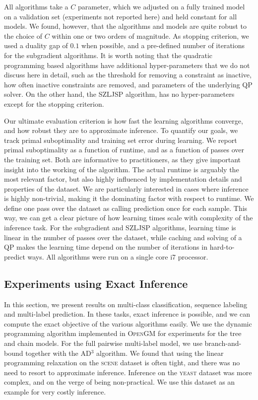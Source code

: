 All algorithms take a $C$ parameter, which we adjusted on a fully trained model
on a validation set (experiments not reported here) and held constant for all
models.  We found, however, that the algorithms and models are quite robust to
the choice of $C$ within one or two orders of magnitude.
As stopping criterion, we used a duality gap of $0.1$ when possible, and a
pre-defined number of iterations for the subgradient algorithms. It is worth
noting that the quadratic programming based algorithms have additional
hyper-parameters that we do not discuss here in detail, such as the threshold
for removing a constraint as inactive, how often inactive constraints are
removed, and parameters of the underlying QP solver. On the other hand, the
SZLJSP algorithm, has no hyper-parameters except for the stopping criterion.

Our ultimate evaluation criterion is how fast the learning algorithms converge,
and how robust they are to approximate inference.  To quantify our goals, we
track primal suboptimality and training set error during learning.
We report primal suboptimality as a function of runtime, and as a function of passes
over the training set.  Both are informative to practitioners, as they give
important insight into the working of the algorithm.  The actual runtime is
arguably the most relevant factor, but also highly influenced by
implementation details and properties of the dataset. We are particularly
interested in cases where inference is highly non-trivial, making it the
dominating factor with respect to runtime.
We define one pass over the dataset as calling prediction once for each sample.
This way, we can get a clear picture of how learning times scale with complexity of the
inference task. For the subgradient and SZLJSP algorithms, learning time is linear
in the number of passes over the dataset, while caching and solving of a QP makes
the learning time depend on the number of iterations in hard-to-predict ways.
All algorithms were run on a single core i7 processor.

\subsection{Experiments using Exact Inference}
In this section, we present results on multi-class classification, sequence
labeling and multi-label prediction. In these tasks, exact inference is
possible, and we can compute the exact objective of the various algorithms
easily. We use the dynamic programming algorithm implemented in \textsc{OpenGM}
for experiments for the tree and chain models.
For the full pairwise multi-label model, we use branch-and-bound together with
the AD$^3$ algorithm. %
We found that using the linear programming relaxation on the \textsc{scene} dataset is
often tight, and there was no need to resort to approximate inference. Inference
on the \textsc{yeast} dataset was more complex, and on the verge of being non-practical.
We use this dataset as an example for very costly inference.

